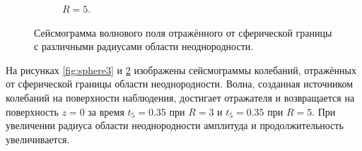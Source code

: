 \documentclass[a4paper, fontsize=14pt]{article}
\begin{document}
\begin{figure}[H]
\begin{subfigure}{.5\textwidth}
			\caption{$R=5$.}
			\label{fig:sphere5}
		\end{subfigure}
		\caption{Сейсмограмма волнового поля отражённого от сферической границы с различными радиусами области неоднородности.}
	\end{figure}
	
	На рисунках \ref{fig:sphere3} и \ref{fig:sphere5} изображены сейсмограммы  колебаний, отражённых от сферической границы области неоднородности.
	Волна, созданная источником колебаний на поверхности наблюдения, достигает отражателя и возвращается на поверхность $z=0$ за время $t_5 = 0.35$ при $R=3$ и $t_5=0.35$ при $R=5$.
	При увеличении радиуса области неоднородности  амплитуда и продолжительность увеличивается. 
	  
	

\end{document}
